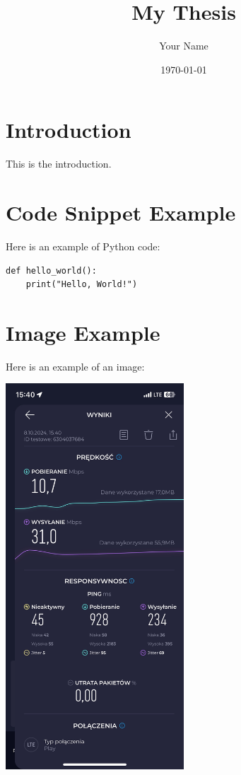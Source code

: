 \documentclass{article}
\begin{document}
\title{My Thesis}
\author{Your Name}
\date{\today}
\maketitle

\section{Introduction}
This is the introduction.

\section{Code Snippet Example}
Here is an example of Python code:

\begin{verbatim}
def hello_world():
    print("Hello, World!")
\end{verbatim}

\section{Image Example}
Here is an example of an image:

\includegraphics[width=0.5\textwidth]{./images/example.jpeg}
\end{document}
